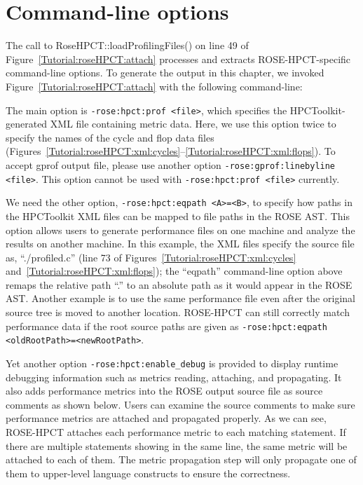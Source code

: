 \section{Command-line options}
\label{sec:rosehpct:cmdlineopts}

The call to RoseHPCT::loadProfilingFiles() on line 49 of
Figure~\ref{Tutorial:roseHPCT:attach} processes and extracts
ROSE-HPCT-specific command-line options. To generate the output in
this chapter, we invoked Figure~\ref{Tutorial:roseHPCT:attach} with
the following command-line:



The main option is \texttt{-rose:hpct:prof <file>}, which specifies
the HPCToolkit-generated XML file containing metric data. Here, we use
this option twice to specify the names of the cycle and flop data
files
(Figures~\ref{Tutorial:roseHPCT:xml:cycles}--\ref{Tutorial:roseHPCT:xml:flops}).
To accept gprof output file, please use another option \texttt{-rose:gprof:linebyline <file>}. 
This option cannot be used with \texttt{-rose:hpct:prof <file>} currently.

We need the other option, \texttt{-rose:hpct:eqpath <A>=<B>}, to
specify how paths in the HPCToolkit XML files can be mapped to file
paths in the ROSE AST. 
This option allows users to generate performance files on one machine and 
analyze the results on another machine.
In this example, the XML
files specify the source file as, ``./profiled.c'' (line 73 of
Figures~\ref{Tutorial:roseHPCT:xml:cycles}
and~\ref{Tutorial:roseHPCT:xml:flops}); the ``eqpath'' command-line
option above remaps the relative path ``.'' to an absolute path as it
would appear in the ROSE AST.
Another example is to use the same performance file even after the original source tree is moved to another location.
ROSE-HPCT can still correctly match performance data if the root source paths are given as \texttt{-rose:hpct:eqpath <oldRootPath>=<newRootPath>}.

Yet another option  \texttt{-rose:hpct:enable\_debug} is provided to display runtime debugging information
such as metrics reading, attaching, and propagating.
It also adds performance metrics into the ROSE output source file as source comments as shown below. 
Users can examine the source comments to make sure performance metrics are attached and propagated properly.
As we can see, ROSE-HPCT attaches each performance metric to each matching statement. 
If there are multiple statements showing in the same line, the same metric will be attached to each of them.
The metric propagation step will only propagate one of them to upper-level language constructs to ensure the correctness.

